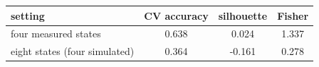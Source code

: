 \begin{tabular}{lccc}
\toprule
setting & CV accuracy & silhouette & Fisher \\
\midrule
four measured states & 0.638 & 0.024 & 1.337 \\
eight states (four simulated) & 0.364 & -0.161 & 0.278 \\
\bottomrule
\end{tabular}
